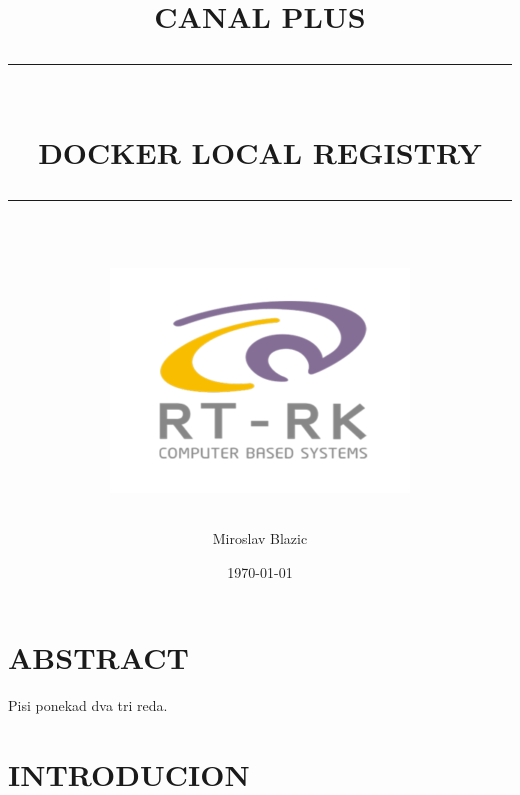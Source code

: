 \documentclass[12pt]{report}
\begin{document}
\newcommand{\HRule}[1]{\rule{\linewidth}{#1}}
\onehalfspacing


\pagestyle{fancy}
\fancyhf{}
\setlength\headheight{15pt}


\title{ \normalsize \textsc{CANAL PLUS}
\\ [1.0cm]
\HRule{0.5pt} \\
\LARGE \textbf{\uppercase{DOCKER LOCAL REGISTRY}}
\HRule{2pt} \\ [0.5cm]
\normalsize  \vspace*{5\baselineskip}
\includegraphics[scale=0.8]{logo_rtrk.png}
}



\author{Miroslav Blazic}
\date{\today\\
}

\maketitle



\newpage
\tableofcontents
\newpage




\section*{ABSTRACT}
Pisi ponekad dva tri reda.
\newpage


\section{INTRODUCION}
\end{document}
